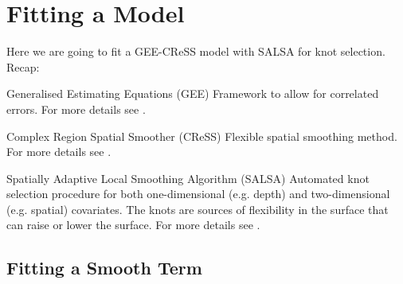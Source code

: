\section{Fitting a Model}
\label{sec:nsmodfit}

\begin{frame}
Here we are going to fit a GEE-CReSS model with SALSA for knot selection. Recap:
\begin{block}{Generalised Estimating Equations (GEE)}
Framework to allow for correlated errors. For more details see \citet{Hardin2002}.
\end{block}

\begin{block}{Complex Region Spatial Smoother (CReSS)}
Flexible spatial smoothing method. For more details see \citet{ScottH2013}.
\end{block}

\begin{block}{Spatially Adaptive Local Smoothing Algorithm (SALSA)}
Automated knot selection procedure for both one-dimensional (e.g. depth) and two-dimensional (e.g. spatial) covariates. The knots are sources of flexibility in the surface that can raise or lower the surface.  For more details see \citet{Walker2010}.
\end{block}
\end{frame}

\subsection{Fitting a Smooth Term}

